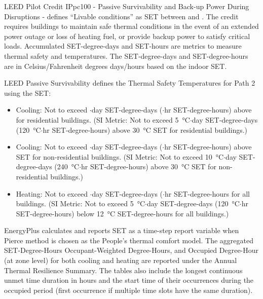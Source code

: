 LEED Pilot Credit IPpc100 - Passive Survivability and Back-up Power During
Disruptions - defines ``Livable conditions'' as SET between  and
. The credit requires buildings to maintain safe thermal
conditions in the event of an extended power outage or loss of heating fuel, or
provide backup power to satisfy critical loads. Accumulated SET-degree-days and
SET-hours are metrics to measure thermal safety and temperatures. The SET-degree-days
and SET-degree-hours are in Celsius/Fahrenheit degrees days/hours based on the indoor SET.

LEED Passive Survivability defines the Thermal Safety Temperatures for Path 2
using the SET:

\begin{itemize}
\item Cooling: Not to exceed $\cdot$day SET-degree-days ($\cdot$hr SET-degree-hours)
  above  for residential buildings. (SI Metric: Not to exceed
  \SI{5}{\celsius}$\cdot$day SET-degree-days (\SI{120}{\celsius}$\cdot$hr SET-degree-hours) above
  \SI{30}{\celsius} SET for residential buildings.)
\item Cooling: Not to exceed $\cdot$day SET-degree-days ($\cdot$hr SET-degree-hours)
  above  SET for non-residential buildings. (SI Metric: Not to
  exceed \SI{10}{\celsius}$\cdot$day SET-degree-days (\SI{240}{\celsius}$\cdot$hr SET-degree-hours) above
  \SI{30}{\celsius} SET for non-residential buildings.)
\item Heating: Not to exceed $\cdot$day SET-degree-days ($\cdot$hr SET-degree-hours
  for all buildings. (SI Metric: Not to exceed \SI{5}{\celsius}$\cdot$day SET-degree-days
  (\SI{120}{\celsius}$\cdot$hr SET-degree-hours) below \SI{12}{\celsius} SET-degree-hours for all
  buildings.)
\end{itemize}

EnergyPlus calculates and reports SET as a time-step report variable when Pierce
method is chosen as the People's thermal comfort model. The aggregated
SET-Degree-Hours Occupant-Weighted Degree-Hours, and Occupied Degree-Hour (at
zone level) for both cooling and heating are reported under the Annual Thermal
Resilience Summary. The tables also include the longest continuous unmet time
duration in hours and the start time of their occurrences during the occupied
period (first occurrence if multiple time slots have the same duration).

